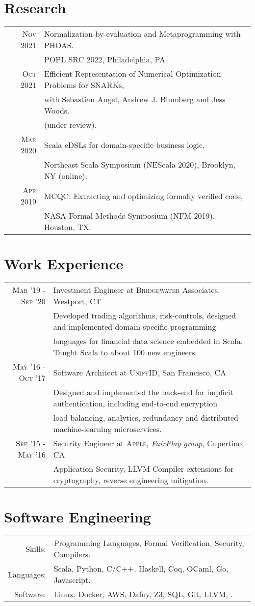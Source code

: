 \documentclass[lettersize,11pt]{article}
\begin{document}
\section{Research}
\begin{tabular}{rl}
    \textsc{Nov} 2021 & Normalization-by-evaluation and Metaprogramming with PHOAS.\\
                      & POPL SRC 2022, Philadelphia, PA  \\[0.5em]
    \textsc{Oct} 2021 & Efficient Representation of Numerical Optimization Problems for SNARKs, \\
                      & with Sebastian Angel, Andrew J. Blumberg and Jess Woods. \\
                      & (under review).  \\[0.5em]
    \textsc{Mar} 2020 & Scala eDSLs for domain-specific business logic, \\
                      & Northeast Scala Symposium (NEScala 2020), Brooklyn, NY (online). \\[0.5em]
    \textsc{Apr} 2019 & MCQC: Extracting and optimizing formally verified code, \\
                      & NASA Formal Methods Symposium (NFM 2019), Houston, TX. \\
\end{tabular}

\section{Work Experience}
\begin{tabular}{rl}
\textsc{Mar} '19 - \textsc{Sep} '20 & Investment Engineer at \textsc{Bridgewater} Associates, Westport, CT\\
&\footnotesize{Developed trading algorithms, risk-controls, designed and implemented domain-specific programming}\\
&\footnotesize{languages for financial data science embedded in Scala. Taught Scala to about 100 new engineers.}\\[0.5em]
\textsc{May} '16 - \textsc{Oct} '17 & Software Architect at \textsc{UnifyID}, San Francisco, CA\\
&\footnotesize{Designed and implemented the back-end for implicit authentication, including end-to-end encryption}\\
&\footnotesize{load-balancing, analytics, redundancy and distributed machine-learning microservices.}\\[0.5em]
\textsc{Sep} '15 - \textsc{May} '16 & Security Engineer at \textsc{Apple}, \emph{FairPlay group}, Cupertino, CA \\
&\footnotesize{Application Security, LLVM Compiler extensions for cryptography, reverse engineering mitigation.}\\[0.5em]
\end{tabular}

\section{Software Engineering}
\begin{tabular}{rl}
Skills:& Programming Languages, Formal Verification, Security, Compilers. \\
Languages: & Scala, Python, C/C++, Haskell, Coq, OCaml, Go, Javascript. \\
Software:& Linux, Docker, AWS, Dafny, Z3, SQL, Git, LLVM, . \\
\end{tabular}
\end{document}
